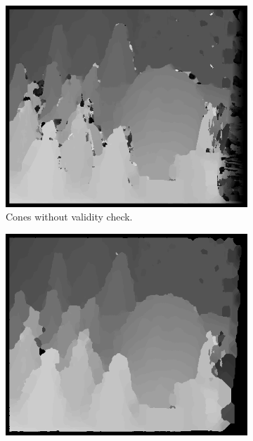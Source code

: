\documentclass[letterpaper,12pt]{article}
\begin{document}
\begin{figure}[!h]
        \centering
        \begin{subfigure}[b]{0.30\textwidth}
                \includegraphics[width=\textwidth]{ConesO.png}
                 \caption{Cones without validity check.}
        \end{subfigure}%
        \quad
        \begin{subfigure}[b]{0.30\textwidth}
                \includegraphics[width=\textwidth]{ConesOcv.png}

\end{subfigure}
\end{figure}
\end{document}
